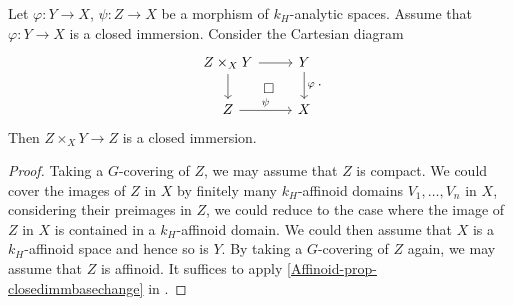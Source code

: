 \begin{proposition}\label{prop-closedimmbaseex}
    Let $\varphi:Y\rightarrow X$, $\psi:Z\rightarrow X$ be a morphism of $k_H$-analytic spaces. Assume that $\varphi:Y\rightarrow X$ is a closed immersion. Consider the Cartesian diagram
    \[
        \begin{tikzcd}
            Z\times_X Y \arrow[r] \arrow[d] \arrow[rd, "\square", phantom] & Y \arrow[d,"\varphi"] \\
            Z \arrow[r,"\psi"]                                                    & X          
        \end{tikzcd}.  
    \]
    Then $Z\times_X Y\rightarrow Z$ is a closed immersion.
\end{proposition}
\begin{proof}
    Taking a $G$-covering of $Z$, we may assume that $Z$ is compact. 
    We could cover the images of $Z$ in $X$ by finitely many $k_H$-affinoid domains $V_1,\ldots,V_n$ in $X$, considering their preimages in $Z$, we could reduce to the case where the image of $Z$ in $X$ is contained in a $k_H$-affinoid domain. We could then assume that $X$ is a $k_H$-affinoid space and hence so is $Y$. By taking a $G$-covering of $Z$ again, we may assume that $Z$ is affinoid. It suffices to apply \cref{Affinoid-prop-closedimmbasechange} in .
\end{proof}


